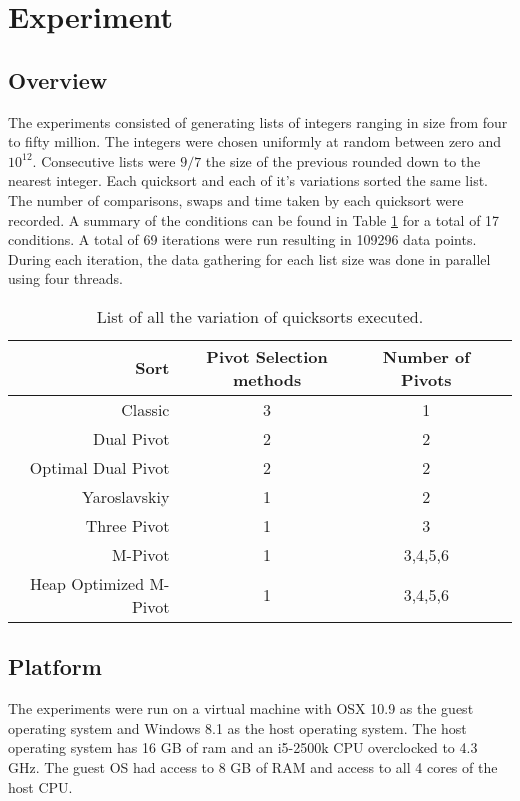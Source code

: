 %

\section{Experiment}
	\label{sec:Experiment}
	\subsection{Overview}
	The experiments consisted of generating lists of integers ranging in size from four to fifty million. The integers were chosen uniformly at random between zero and $10^{12}$. Consecutive lists were $9/7$ the size of the previous rounded down to the nearest integer. Each quicksort and each of it's variations sorted the same list. The number of comparisons, swaps and time taken by each quicksort were recorded. A summary of the conditions can be found in Table \ref{tab:experimentConditions} for a total of 17 conditions. A total of 69 iterations were run resulting in 109296 data points. During each iteration, the data gathering for each list size was done in parallel using four threads.

	\begin{table}
		\begin{center}
			\begin{tabular}{|r|c|c|c}
				\hline
				Sort           			&  Pivot Selection methods 	& Number of Pivots 	\\ \hline \hline
				Classic                 &  3 						& 1       			\\ \hline
				Dual Pivot              &  2  						& 2       			\\ \hline
				Optimal Dual Pivot      &  2  						& 2       			\\ \hline
				Yaroslavskiy            &  1  						& 2       			\\ \hline
				Three Pivot             &  1  						& 3       			\\ \hline
				M-Pivot                 &  1  						& 3,4,5,6 			\\ \hline
				Heap Optimized M-Pivot  &  1  						& 3,4,5,6 			\\ \hline
			\end{tabular}
			\caption{List of all the variation of quicksorts executed.}
			\label{tab:experimentConditions}
		\end{center}
	\end{table}


	\subsection{Platform}
	The experiments were run on a virtual machine with OSX 10.9 as the guest operating system and Windows 8.1 as the host operating system. The host operating system has 16 GB of ram and an i5-2500k CPU overclocked to 4.3 GHz. The guest OS had access to 8 GB of RAM and access to all 4 cores of the host CPU.

